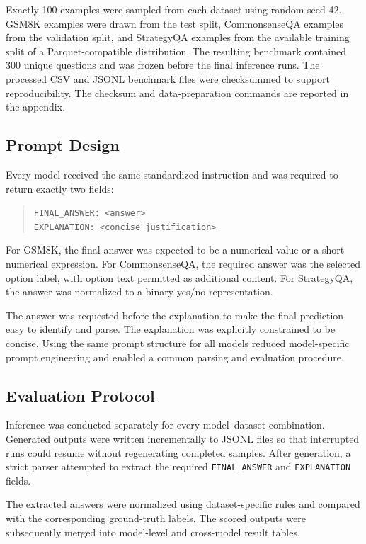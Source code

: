 \documentclass{article}
\begin{document}
Exactly 100 examples were sampled from each dataset using random seed
42. GSM8K examples were drawn from the test split, CommonsenseQA
examples from the validation split, and StrategyQA examples from the
available training split of a Parquet-compatible distribution. The
resulting benchmark contained 300 unique questions and was frozen
before the final inference runs. The processed CSV and JSONL benchmark
files were checksummed to support reproducibility. The checksum and
data-preparation commands are reported in the appendix.

\subsection{Prompt Design}

Every model received the same standardized instruction and was required
to return exactly two fields:

\begin{quote}
\texttt{FINAL\_ANSWER: <answer>}\\
\texttt{EXPLANATION: <concise justification>}
\end{quote}

For GSM8K, the final answer was expected to be a numerical value or a
short numerical expression. For CommonsenseQA, the required answer was
the selected option label, with option text permitted as additional
content. For StrategyQA, the answer was normalized to a binary
yes/no representation.

The answer was requested before the explanation to make the final
prediction easy to identify and parse. The explanation was explicitly
constrained to be concise. Using the same prompt structure for all
models reduced model-specific prompt engineering and enabled a common
parsing and evaluation procedure.

\subsection{Evaluation Protocol}

Inference was conducted separately for every model--dataset
combination. Generated outputs were written incrementally to JSONL
files so that interrupted runs could resume without regenerating
completed samples. After generation, a strict parser attempted to
extract the required \texttt{FINAL\_ANSWER} and
\texttt{EXPLANATION} fields.

The extracted answers were normalized using dataset-specific rules and
compared with the corresponding ground-truth labels. The scored outputs
were subsequently merged into model-level and cross-model result
tables.
\end{document}
